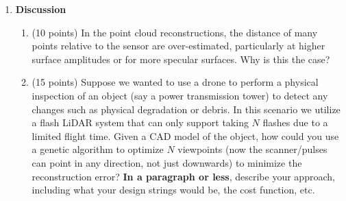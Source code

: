 \documentclass[../../me144_244_student.tex]{subfiles}
\begin{document}
\begin{enumerate}
\begin{enumerate}
    \end{enumerate}
    \item \textbf{Discussion}
    \begin{enumerate}
        \item (10 points) In the point cloud reconstructions, the distance of many points relative
        to the sensor are over-estimated, particularly at higher surface amplitudes or for more
        specular surfaces. Why is this the case?


        \item (15 points) Suppose we wanted to use a drone to perform a physical inspection of an
        object (say a power transmission tower) to detect any changes such as physical degradation
        or debris. In this scenario we utilize a flash LiDAR system that can only support taking $N$
        flashes due to a limited flight time. Given a CAD model of the object, how could you use a
        genetic algorithm to optimize $N$ viewpoints (now the scanner/pulses can point in any
        direction, not just downwards) to minimize the reconstruction error? \textbf{In a paragraph
        or less}, describe your approach, including what your design strings would be, the cost
        function, etc.

    \end{enumerate}
\end{enumerate}



\vspace{2 em}

\end{document}
